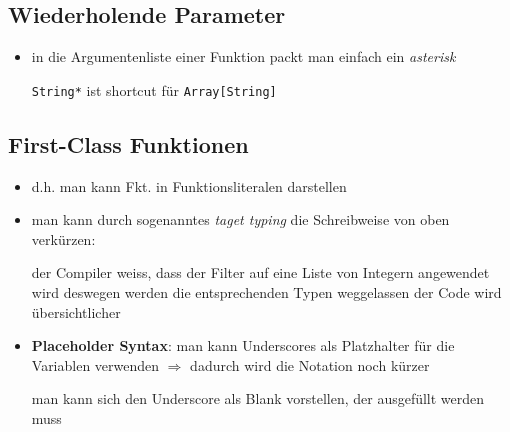 \subsection{Wiederholende Parameter}
\begin{itemize}
  \item in die Argumentenliste einer Funktion packt man einfach ein 
  \textit{asterisk}
  
  
  
  \texttt{String*} ist shortcut für \texttt{Array[String]}  
\end{itemize}


\subsection{First-Class Funktionen}
\begin{itemize}
  \item d.h. man kann Fkt. in Funktionsliteralen
  darstellen
  
  

  \item man kann durch sogenanntes \textit{taget typing} die
  Schreibweise von oben verkürzen:
  
  
  
  der Compiler weiss, dass der Filter auf eine Liste von Integern
  angewendet wird \und deswegen werden die entsprechenden Typen
  weggelassen \und der Code wird übersichtlicher
  
  \item \textbf{Placeholder Syntax}: man kann Underscores als 
  Platzhalter für die Variablen verwenden $\Rightarrow$ dadurch
  wird die Notation noch kürzer
  
  
  
  man kann sich den Underscore als Blank vorstellen, der ausgefüllt
  werden muss
  
\end{itemize}


